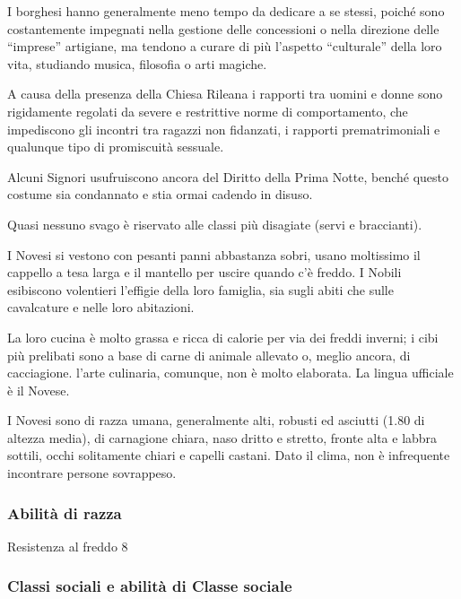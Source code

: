 I borghesi hanno generalmente meno tempo da dedicare a se stessi,
poich\'e sono costantemente impegnati nella gestione delle concessioni
o nella direzione delle ``imprese'' artigiane, ma tendono a curare di
pi\`u l'aspetto ``culturale'' della loro vita, studiando musica,
filosofia o arti magiche.

A causa della presenza della Chiesa Rileana i rapporti tra uomini e
donne sono rigidamente regolati da severe e restrittive norme di
comportamento, che impediscono gli incontri tra ragazzi non fidanzati,
i rapporti prematrimoniali e qualunque tipo di promiscuit\`a
sessuale.

Alcuni Signori usufruiscono ancora del Diritto della Prima Notte,
bench\'e questo costume sia condannato e stia ormai cadendo in disuso.

Quasi nessuno svago \`e riservato alle classi pi\`u disagiate
(servi e braccianti).

I Novesi si vestono con pesanti panni abbastanza sobri, usano
moltissimo il cappello a tesa larga e il mantello per uscire quando
c'\`e freddo. I Nobili esibiscono volentieri l'effigie della loro
famiglia, sia sugli abiti che sulle cavalcature e nelle loro
abitazioni.

La loro cucina \`e molto grassa e ricca di calorie per via dei
freddi inverni; i cibi pi\`u prelibati sono a base di carne di
animale allevato o, meglio ancora, di cacciagione. l'arte culinaria,
comunque, non \`e molto elaborata. La lingua ufficiale \`e il
Novese.

\Fisico I Novesi sono di razza umana, generalmente alti, robusti ed
asciutti (1.80 di altezza media), di carnagione chiara, naso dritto e
stretto, fronte alta e labbra sottili, occhi solitamente chiari e
capelli castani. Dato il clima, non \`e infrequente incontrare persone
sovrappeso.

\minmaxumani

\subsubsection{Abilit\`a di razza}

\begin{abilist}
\item Resistenza al freddo 8
\end{abilist}

\subsubsection{Classi sociali e abilit\`a di Classe sociale}

